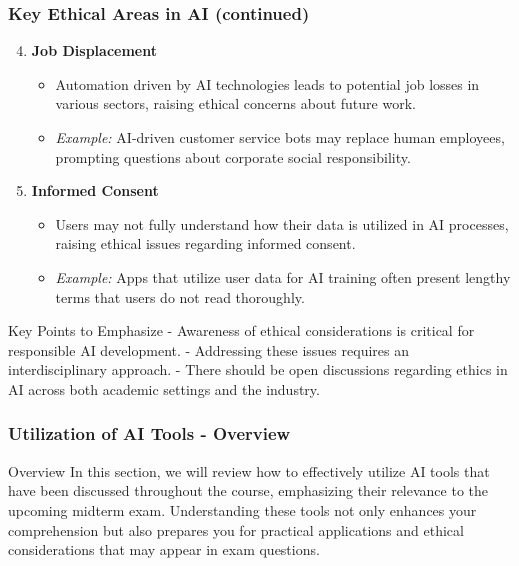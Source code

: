 \documentclass[aspectratio=169]{beamer}
\begin{document}
\begin{frame}[fragile]
    \frametitle{Key Ethical Areas in AI (continued)}
    \begin{enumerate}
        \setcounter{enumi}{3} %
        \item \textbf{Job Displacement}
          \begin{itemize}
              \item Automation driven by AI technologies leads to potential job losses in various sectors, raising ethical concerns about future work.
              \item \textit{Example:} AI-driven customer service bots may replace human employees, prompting questions about corporate social responsibility.
          \end{itemize}
          
        \item \textbf{Informed Consent}
          \begin{itemize}
              \item Users may not fully understand how their data is utilized in AI processes, raising ethical issues regarding informed consent.
              \item \textit{Example:} Apps that utilize user data for AI training often present lengthy terms that users do not read thoroughly.
          \end{itemize}
    \end{enumerate}
    
    \begin{block}{Key Points to Emphasize}
        - Awareness of ethical considerations is critical for responsible AI development.
        - Addressing these issues requires an interdisciplinary approach.
        - There should be open discussions regarding ethics in AI across both academic settings and the industry.
    \end{block}
\end{frame}

\begin{frame}[fragile]
    \frametitle{Utilization of AI Tools - Overview}
    \begin{block}{Overview}
        In this section, we will review how to effectively utilize AI tools that have been discussed throughout the course, emphasizing their relevance to the upcoming midterm exam. 
        Understanding these tools not only enhances your comprehension but also prepares you for practical applications and ethical considerations that may appear in exam questions.
    \end{block}
\end{frame}
\end{document}
